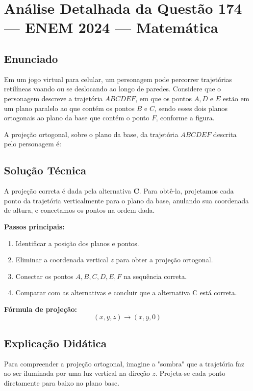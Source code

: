 \documentclass{article}
\begin{document}
\section*{Análise Detalhada da Questão 174 — ENEM 2024 — Matemática}

\subsection*{Enunciado}
Em um jogo virtual para celular, um personagem pode percorrer trajetórias retilíneas voando ou se deslocando ao longo de paredes. Considere que o personagem descreve a trajetória \( ABCDEF \), em que os pontos \( A, D \) e \( E \) estão em um plano paralelo ao que contém os pontos \( B \) e \( C \), sendo esses dois planos ortogonais ao plano da base que contém o ponto \( F \), conforme a figura.

A projeção ortogonal, sobre o plano da base, da trajetória \( ABCDEF \) descrita pelo personagem é:

\subsection*{Solução Técnica}

A projeção correta é dada pela alternativa \textbf{C}. Para obtê-la, projetamos cada ponto da trajetória verticalmente para o plano da base, anulando sua coordenada de altura, e conectamos os pontos na ordem dada.

\bigskip

\textbf{Passos principais:}
\begin{enumerate}
  \item Identificar a posição dos planos e pontos.
  \item Eliminar a coordenada vertical \( z \) para obter a projeção ortogonal.
  \item Conectar os pontos \( A, B, C, D, E, F \) na sequência correta.
  \item Comparar com as alternativas e concluir que a alternativa C está correta.
\end{enumerate}

\bigskip

\textbf{Fórmula de projeção:}
\[
(x,y,z) \to (x,y,0)
\]

\subsection*{Explicação Didática}

Para compreender a projeção ortogonal, imagine a "sombra" que a trajetória faz ao ser iluminada por uma luz vertical na direção \( z \). Projeta-se cada ponto diretamente para baixo no plano base.
\end{document}
